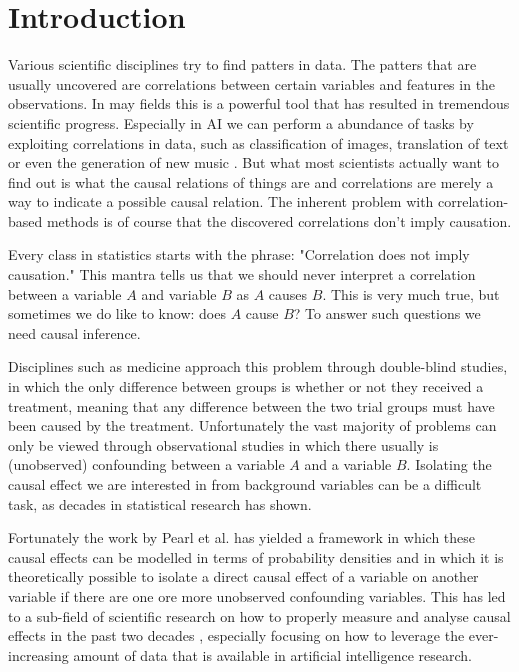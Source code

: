 \documentclass{report}
\begin{document}
\chapter{Introduction}
Various scientific disciplines try to find patters in data. The patters that are usually uncovered are correlations between certain variables and features in the observations. In may fields this is a powerful tool that has resulted in tremendous scientific progress. Especially in AI we can perform a abundance of tasks by exploiting correlations in data, such as classification of images, translation of text or even the generation of new music \cite{deng2009imagenet} \cite{bahdanau2014neural} \cite{payne2019musenet}.
But what most scientists actually want to find out is what the causal relations of things are and correlations are merely a way to indicate a possible causal relation. The inherent problem with correlation-based methods is of course that the discovered correlations don't imply causation.

Every class in statistics starts with the phrase: "Correlation does not imply causation." This mantra tells us that we should never interpret a correlation between a variable $A$ and variable $B$ as $A$ causes $B$. This is very much true, but sometimes we do like to know: does $A$ cause $B$? To answer such questions we need causal inference. 

Disciplines such as medicine approach this problem through double-blind studies, in which the only difference between groups is whether or not they received a treatment, meaning that any difference between the two trial groups must have been caused by the treatment\cite{gotzsche1989methodology}. Unfortunately the vast majority of problems can only be viewed through observational studies in which there usually is (unobserved) confounding between a variable $A$ and a variable $B$. Isolating the causal effect we are interested in from background variables can be a difficult task, as decades in statistical research has shown.

Fortunately the work by Pearl et al.\cite{pearl2009causal} \cite{pearl1995causal} has yielded a framework in which these causal effects can be modelled in terms of probability densities and in which it is theoretically possible to isolate a direct causal effect of a variable on another variable if there are one ore more unobserved confounding variables. This has led to a sub-field of scientific research on how to properly measure and analyse causal effects in the past two decades \cite{pearl2003statistics} \cite{hill2011bayesian} \cite{guo2020survey}, especially focusing on how to leverage the ever-increasing amount of data that is available in artificial intelligence research.
\end{document}
